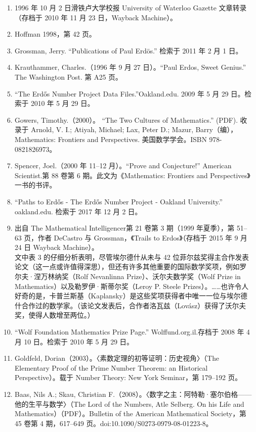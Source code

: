 \begin{enumerate}
\item 1996 年 10 月 2 日滑铁卢大学校报 University of Waterloo Gazette 文章转录（存档于 2010 年 11 月 23 日，Wayback Machine）。
\item Hoffman 1998，第 42 页。
\item Grossman, Jerry. “Publications of Paul Erdös.” 检索于 2011 年 2 月 1 日。
\item Krauthammer, Charles.（1996 年 9 月 27 日）。“Paul Erdos, Sweet Genius.” The Washington Post. 第 A25 页。
\item “The Erdős Number Project Data Files.”Oakland.edu. 2009 年 5 月 29 日。检索于 2010 年 5 月 29 日。
\item Gowers, Timothy.（2000）。 “The Two Cultures of Mathematics.” (PDF). 收录于 Arnold, V. I.; Atiyah, Michael; Lax, Peter D.; Mazur, Barry（编），Mathematics: Frontiers and Perspectives. 美国数学学会。ISBN 978-0821826973。
\item Spencer, Joel.（2000 年 11–12 月）。“Prove and Conjecture!” American Scientist.第 88 卷第 6 期。此文为《Mathematics: Frontiers and Perspectives》一书的书评。
\item  “Paths to Erdős - The Erdős Number Project - Oakland University.” oakland.edu. 检索于 2017 年 12 月 2 日。
\item 出自 The Mathematical Intelligencer第 21 卷第 3 期（1999 年夏季），第 51–63 页，作者 DeCastro 与 Grossman，《Trails to Erdos》（存档于 2015 年 9 月 24 日 Wayback Machine）。\\
文中表 3 的仔细分析表明，尽管埃尔德什从未与 42 位菲尔兹奖得主合作发表论文（这一点或许值得深思），但还有许多其他重要的国际数学奖项，例如罗尔夫·涅万林纳奖（Rolf Nevanlinna Prize）、沃尔夫数学奖（Wolf Prize in Mathematics）以及勒罗伊·斯蒂尔奖（Leroy P. Steele Prizes）。……也许令人好奇的是，卡普兰斯基（Kaplansky）是这些奖项获得者中唯一一位与埃尔德什合作过的数学家。（该论文发表后，合作者洛瓦兹（Lovász）获得了沃尔夫奖，使得人数增至两位。）
\item “Wolf Foundation Mathematics Prize Page.” Wolffund.org.il.存档于 2008 年 4 月 10 日。检索于 2010 年 5 月 29 日。
\item Goldfeld, Dorian（2003）。〈素数定理的初等证明：历史视角〉（The Elementary Proof of the Prime Number Theorem: an Historical Perspective）。载于 Number Theory: New York Seminar，第 179–192 页。
\item Baas, Nils A.; Skau, Christian F.（2008）。〈数字之主：阿特勒·塞尔伯格——他的生平与数学〉（The Lord of the Numbers, Atle Selberg. On his Life and Mathematics）（PDF）。Bulletin of the American Mathematical Society，第 45 卷第 4 期，617–649 页。doi:10.1090/S0273-0979-08-01223-8。

\end{enumerate}
